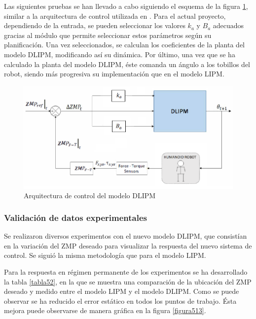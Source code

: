 Las siguientes pruebas se han llevado a cabo siguiendo el esquema de la figura \ref{figura512}, similar a la arquitectura de control utilizada en \cite{ref21}. Para el actual proyecto, dependiendo de la entrada, se pueden seleccionar los valores $k_a$ y $B_a$ adecuados gracias al módulo que permite seleccionar estos parámetros según su planificación. Una vez seleccionados, se calculan los coeficientes de la planta del modelo DLIPM, modificando así su dinámica. Por último, una vez que se ha calculado la planta del modelo DLIPM, éste comanda un ángulo a los tobillos del robot, siendo más progresiva su implementación que en el modelo LIPM.

\begin{figure}[H]
\centering
\includegraphics[scale=0.55]{imagenes/apartado_5/512_esquema_DLIPM}
\caption{Arquitectura de control del modelo DLIPM}
\label{figura512}
\end{figure}

\subsubsection{Validación de datos experimentales}

Se realizaron diversos experimentos con el nuevo modelo DLIPM, que consistían en la variación del ZMP deseado para visualizar la respuesta del nuevo sistema de control. Se siguió la misma metodología que para el modelo LIPM.

Para la respuesta en régimen permanente de los experimentos se ha desarrollado la tabla \ref{tabla52}, en la que se muestra una comparación de la ubicación del ZMP deseado y medido entre el modelo LIPM y el modelo DLIPM. Como se puede observar se ha reducido el error estático en todos los puntos de trabajo. Ésta mejora puede observarse de manera gráfica en la figura \ref{figura513}.

